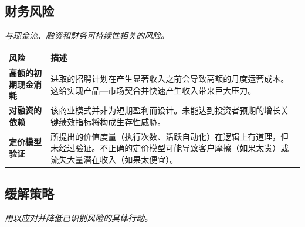 \documentclass[11pt, a4paper, oneside]{article}
\begin{document}
\newpage
\subsection{财务风险}
\textit{与现金流、融资和财务可持续性相关的风险。}

\begin{table}[H]
\centering
\begin{tabularx}{\textwidth}{@{}lL@{}}
\toprule
\textbf{风险} & \textbf{描述} \\
\midrule
\textbf{高额的初期现金消耗} & 进取的招聘计划在产生显著收入之前会导致高额的月度运营成本。这给实现产品—市场契合并快速产生收入带来巨大压力。 \\
\addlinespace
\textbf{对融资的依赖} & 该商业模式并非为短期盈利而设计。未能达到投资者预期的增长关键绩效指标将构成生存性威胁。 \\
\addlinespace
\textbf{定价模型验证} & 所提出的价值度量（执行次数、活跃自动化）在逻辑上有道理，但未经过验证。不正确的定价模型可能导致客户摩擦（如果太贵）或流失大量潜在收入（如果太便宜）。 \\
\bottomrule
\end{tabularx}
\end{table}

\newpage
\subsection{缓解策略}
\textit{用以应对并降低已识别风险的具体行动。}
\end{document}
